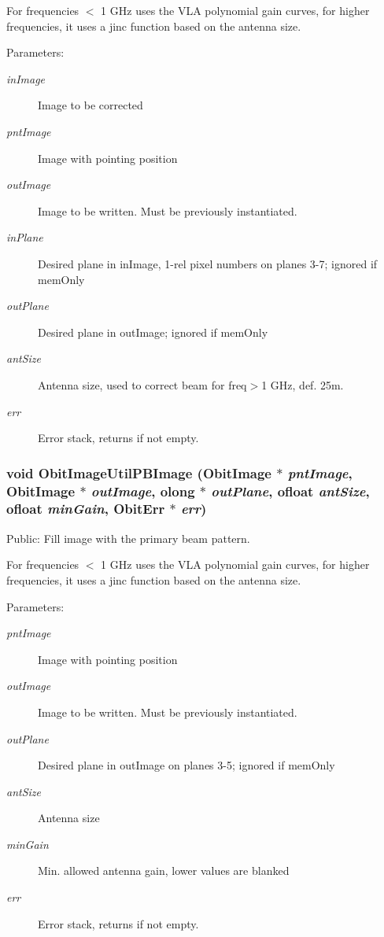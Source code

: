 For frequencies $<$ 1 GHz uses the VLA polynomial gain curves, for higher frequencies, it uses a jinc function based on the antenna size. \begin{Desc}
\item[Parameters:]
\begin{description}
\item[{\em in\-Image}]Image to be corrected \item[{\em pnt\-Image}]Image with pointing position \item[{\em out\-Image}]Image to be written. Must be previously instantiated. \item[{\em in\-Plane}]Desired plane in in\-Image, 1-rel pixel numbers on planes 3-7; ignored if mem\-Only \item[{\em out\-Plane}]Desired plane in out\-Image; ignored if mem\-Only \item[{\em ant\-Size}]Antenna size, used to correct beam for freq$>$1 GHz, def. 25m. \item[{\em err}]Error stack, returns if not empty. \end{description}
\end{Desc}
\subsubsection{\setlength{\rightskip}{0pt plus 5cm}void Obit\-Image\-Util\-PBImage ({\bf Obit\-Image} $\ast$ {\em pnt\-Image}, {\bf Obit\-Image} $\ast$ {\em out\-Image}, {\bf olong} $\ast$ {\em out\-Plane}, {\bf ofloat} {\em ant\-Size}, {\bf ofloat} {\em min\-Gain}, {\bf Obit\-Err} $\ast$ {\em err})}\label{ObitImageUtil_8h_a11}


Public: Fill image with the primary beam pattern. 

For frequencies $<$ 1 GHz uses the VLA polynomial gain curves, for higher frequencies, it uses a jinc function based on the antenna size. \begin{Desc}
\item[Parameters:]
\begin{description}
\item[{\em pnt\-Image}]Image with pointing position \item[{\em out\-Image}]Image to be written. Must be previously instantiated. \item[{\em out\-Plane}]Desired plane in out\-Image on planes 3-5; ignored if mem\-Only \item[{\em ant\-Size}]Antenna size \item[{\em min\-Gain}]Min. allowed antenna gain, lower values are blanked \item[{\em err}]Error stack, returns if not empty. \end{description}
\end{Desc}
